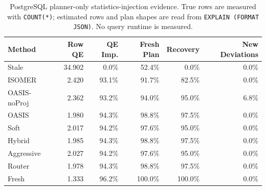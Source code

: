 \begin{table}[t]
  \centering
  \small
  \caption{PostgreSQL planner-only statistics-injection evidence. True rows are measured with \texttt{COUNT(*)}; estimated rows and plan shapes are read from \texttt{EXPLAIN (FORMAT JSON)}. No query runtime is measured.}
  \label{tab:postgres_planner_stats_injection}
  \setlength{\tabcolsep}{4pt}
  \begin{tabular}{lrrrrr}
    \toprule
    Method & Row QE & QE Imp. & Fresh Plan & Recovery & New Deviations \\
    \midrule
    Stale & 34.902 & 0.0\% & 52.4\% & 0.0\% & 0.0\% \\
    ISOMER & 2.420 & 93.1\% & 91.7\% & 82.5\% & 0.0\% \\
    OASIS-noProj & 2.362 & 93.2\% & 94.0\% & 95.0\% & 6.8\% \\
    OASIS & 1.980 & 94.3\% & 98.8\% & 97.5\% & 0.0\% \\
    Soft & 2.017 & 94.2\% & 97.6\% & 95.0\% & 0.0\% \\
    Hybrid & 1.985 & 94.3\% & 98.8\% & 97.5\% & 0.0\% \\
    Aggressive & 2.027 & 94.2\% & 97.6\% & 95.0\% & 0.0\% \\
    Router & 1.978 & 94.3\% & 98.8\% & 97.5\% & 0.0\% \\
    Fresh & 1.333 & 96.2\% & 100.0\% & 100.0\% & 0.0\% \\
    \bottomrule
  \end{tabular}
\end{table}
